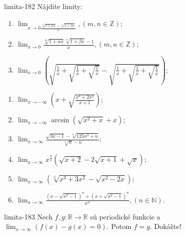 \begin{defproblem}{limita-182}
Nájdite limity:
\begin{enumerate}
\item $\lim_{x \rightarrow 0 \frac{\sqrt[m]{1+\alpha x}-\sqrt[n]{1+\beta x}}{x}},(m,n \in \mathbb{Z})$;
\item $\lim_{x \rightarrow 0}  \frac{\sqrt[m]{1+\alpha x}\sqrt[n]{1+\beta x}-1}{x},(m,n \in \mathbb{Z})$;
\item $\lim_{x \rightarrow 0} (\sqrt{\frac{1}{x}+\sqrt{\frac{1}{x}+\sqrt{\frac{1}{x}}}}-\sqrt{\frac{1}{x}+\sqrt{\frac{1}{x}+\sqrt{\frac{1}{x}}}})$;
\end{enumerate}
\begin{multicols}{2}
\begin{enumerate}[resume]
    \item $\lim_{x \rightarrow -\infty} (x+\sqrt{\frac{x^3+2x^2}{x+1}})$;
    \item $\lim_{x \rightarrow -\infty} \arcsin (\sqrt{x^2+x}+x)$;
    \item $\lim_{x \rightarrow \infty} \frac{\sqrt{3x-1}-\sqrt[3]{125n^3+n}}{\sqrt[5]{n}-n}$;
    \item $\lim_{x \rightarrow \infty} x^{\frac{3}{2}}(\sqrt{x+2}-2\sqrt{x+1}+\sqrt{x})$;
    \item $\lim_{x \rightarrow \infty} (\sqrt[3]{x^3+3x^2}-\sqrt{x^2-2x})$;
    \item $\lim_{x \rightarrow \infty} \frac{(x-\sqrt{x^2-1})^n+(x+\sqrt{x^2-1})^n}{x^n}, (n \in \mathbb{N})$.
\end{enumerate}
\end{multicols}
\end{defproblem}

\begin{defproblem}{limita-183}
Nech $f,g: \mathbb{R} \rightarrow \mathbb{R}$ sú periodické funkcie a $\lim_{x \rightarrow \infty} (f(x)-g(x)=0)$. Potom $f=g$. Dokážte!
\end{defproblem}

